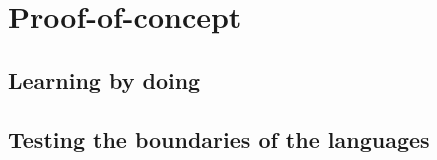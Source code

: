\section{Proof-of-concept}
    \subsection{Learning by doing}
    \subsection{Testing the boundaries of the languages}
